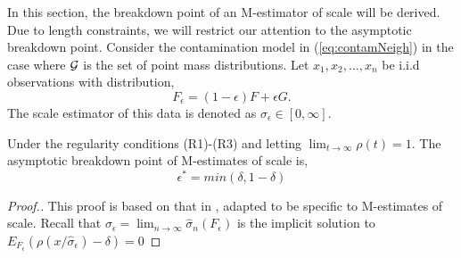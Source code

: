 In this section, the breakdown point of an M-estimator of scale will be derived. Due to length constraints, we will restrict our attention to the asymptotic breakdown point. Consider the contamination model in (\ref{eq:contamNeigh}) in the case where $\mathcal{G}$ is the set of point mass distributions. Let $x_1, x_2, \hdots, x_n$ be i.i.d observations with distribution, 
$$ F_\epsilon = (1-\epsilon)F + \epsilon G.$$
The scale estimator of this data is denoted as $\sigma_\epsilon \in [0, \infty]$.

\begin{thm}
Under the regularity conditions (R1)-(R3) and letting $\lim_{t\xrightarrow{}\infty} \rho(t) = 1$. The asymptotic breakdown point of M-estimates of scale is,
$$ \epsilon^* = min(\delta,1-\delta) $$
\end{thm}
\begin{proof}[Proof.]
This proof is based on that in \cite{maronna2019robust}, adapted to be specific to M-estimates of scale. Recall that $ \sigma_\epsilon = \lim_{n \xrightarrow{} \infty} \hat \sigma_n(F_\epsilon) $ is the implicit solution to $E_{F_\epsilon} (\rho(x/\hat\sigma_\epsilon) - \delta) = 0$


\end{proof}
